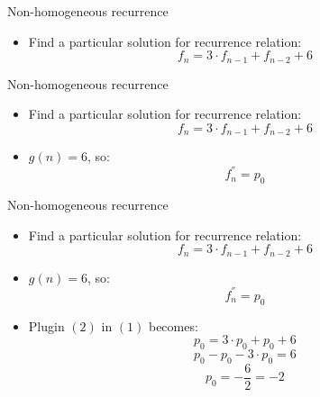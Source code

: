 \documentclass{beamer}
\begin{document}
\begin{frame}{Non-homogeneous recurrence}
    \begin{itemize}
        \item Find a particular solution for recurrence relation:
            \begin{equation}\tag{1}
                f_n = 3 \cdot f_{n-1} + f_{n-2} + 6
            \end{equation}
    \end{itemize}
\end{frame}

\begin{frame}{Non-homogeneous recurrence}
    \begin{itemize}
        \item Find a particular solution for recurrence relation:
            \begin{equation}\tag{1}
                f_n = 3 \cdot f_{n-1} + f_{n-2} + 6
            \end{equation}
        \item $g(n) = 6$, so:
            \begin{equation}\tag{2}
                f_n^{''} = p_0
            \end{equation}
    \end{itemize}
\end{frame}

\begin{frame}{Non-homogeneous recurrence}
    \begin{itemize}
        \item Find a particular solution for recurrence relation:
            \begin{equation}\tag{1}
                f_n = 3 \cdot f_{n-1} + f_{n-2} + 6
            \end{equation}
        \item $g(n) = 6$, so:
            \begin{equation}\tag{2}
                f_n^{''} = p_0
            \end{equation}
        \item Plugin $(2)$ in $(1)$ becomes: 
            $$ p_0 = 3 \cdot p_0 + p_0 + 6 $$
            $$ p_0 - p_0 - 3 \cdot p_0 = 6 $$
            \begin{equation}\tag{3}
                p_0 = - \frac{6}{2} =  -2
            \end{equation}
    \end{itemize}
\end{frame}
\end{document}
